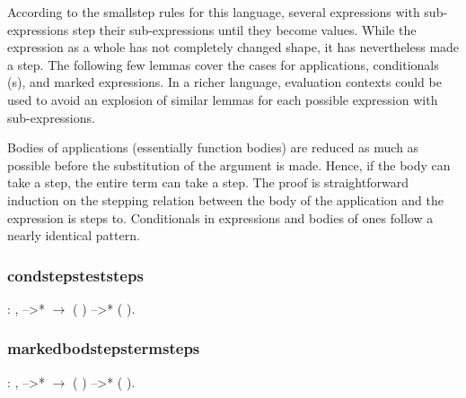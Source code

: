 \documentclass[12pt]{report}
\begin{document}
According to the smallstep rules for this language, several
expressions with sub-expressions step their sub-expressions until
they become values. While the expression as a whole has not
completely changed shape, it has nevertheless made a step. The
following few lemmas cover the cases for applications, conditionals
(s), and marked expressions. In a richer language,
evaluation contexts could be used to avoid an explosion of similar
lemmas for each possible expression with sub-expressions. 

Bodies of applications (essentially function bodies) are reduced as
much as possible before the substitution of the argument is made.
Hence, if the body can take a step, the entire term can take a step.
The proof is straightforward induction on the stepping relation
between the body of the application and the expression is steps to.
Conditionals in  expressions and bodies of
 ones follow a nearly identical pattern. 

\subsubsection{condstepsteststeps}

\begin{coqdoccode}
\coqdocemptyline
\coqdocindent{1.00em}
  : \coqdockw{\ensuremath{\forall}}    ,\coqdoceol
\coqdocindent{2.00em}
 -->*  \ensuremath{\rightarrow}\coqdoceol
\coqdocindent{2.00em}
(   ) -->* (   ).\coqdoceol
\coqdocemptyline
\end{coqdoccode}
\subsubsection{markedbodstepstermsteps}

\begin{coqdoccode}
\coqdocemptyline
\coqdocindent{1.00em}
  : \coqdockw{\ensuremath{\forall}}   ,\coqdoceol
\coqdocindent{2.00em}
 -->*  \ensuremath{\rightarrow}\coqdoceol
\coqdocindent{2.00em}
(  ) -->* (  ).\coqdoceol
\coqdocemptyline
\end{coqdoccode}
\end{document}
